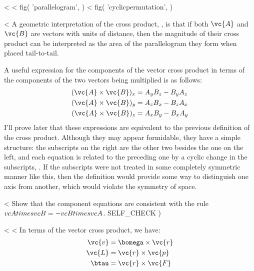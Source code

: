 <%
<%
  fig(
    'parallelogram',
  )
\spacebetweenfigs
<%
  fig(
    'cyclicpermutation',
  )

<%
A geometric interpretation of the cross product, ,  is that
if both $\vc{A}$ and $\vc{B}$ are vectors with units of distance, then the
magnitude of their cross product can be interpreted as the
area of the parallelogram they form when placed
tail-to-tail.

A useful expression for the components of the vector cross
product in terms of the components of the two vectors being
multiplied is as follows:
\begin{align*}
        (\vc{A}\times\vc{B})_x        &=  A_yB_z - B_yA_z\\
        (\vc{A}\times\vc{B})_y        &=  A_zB_x - B_zA_x\\
        (\vc{A}\times\vc{B})_z        &=  A_xB_y - B_xA_y
\end{align*}
I'll prove later that these expressions are
equivalent to the previous definition of the cross product.
Although they may appear formidable, they have a simple
structure: the subscripts on the right are the other two
besides the one on the left, and each equation is related to
the preceding one by a cyclic change in the subscripts, .
If the subscripts were not treated in some completely
symmetric manner like this, then the definition would
provide some way to distinguish one axis from another, which
would violate the symmetry of space.

<%
Show that the component equations are consistent with the
rule $\\vc{A}\\times\\vc{B} = -\\vc{B}\\times\\vc{A}$.
  SELF_CHECK
  ) %

<%
<%
In terms of the vector cross product, we have:
\begin{align*}
        \vc{v} &= \bomega \times \vc{r}\\
        \vc{L} &= \vc{r}  \times \vc{p}\\
        \btau &= \vc{r} \times \vc{F}
\end{align*}

